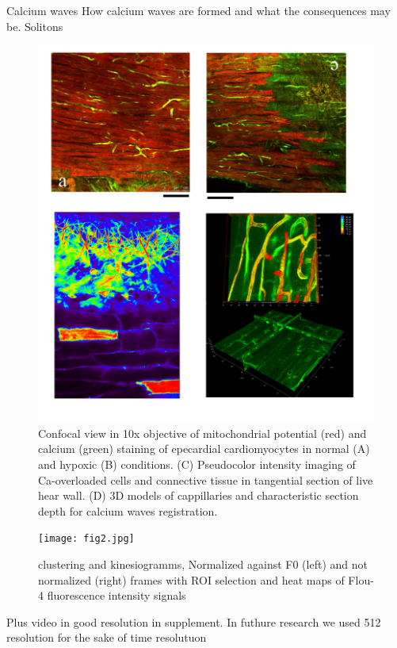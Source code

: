\documentclass{biophys-new}
\begin{document}
Calcium waves
How calcium waves are formed and what the consequences may be.
Solitons


\begin{figure}[hbt!]
\centering
\includegraphics[width=0.8\linewidth]{fig1.png}
\caption{Confocal view in 10x objective of mitochondrial potential (red) and calcium (green) staining of epecardial cardiomyocytes in normal (A) and hypoxic (B) conditions. (C) Pseudocolor intensity imaging of Ca-overloaded cells and connective tissue in  tangential section of live hear wall. (D) 3D models of  cappillaries and characteristic section depth for calcium waves registration.}
\label{fig:fig1}
\end{figure}


\begin{figure}
    \texttt{[image: fig2.jpg]}
    \caption{clustering and kinesiogramms, Normalized against F0 (left) and not normalized (right) frames with ROI selection and heat maps of Flou-4 fluorescence intensity signals }
    \label{fig:fig2}
\end{figure}

Plus video in good resolution in supplement. In futhure research we used 512 resolution for the sake of time resolutuon
\end{document}
